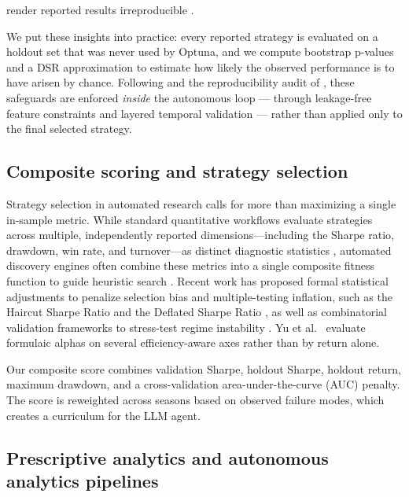 \documentclass[analytics,article,submit,pdftex,moreauthors]{Definitions/mdpi}
\begin{document}
render reported results irreproducible \citep{yao_zheng_2026}.

We put these insights into practice: every reported strategy is evaluated on a holdout set that was never used by Optuna, and we compute bootstrap p-values and a DSR approximation to estimate how likely the observed performance is to have arisen by chance. Following \citep{benjamini_hochberg_1995} and the reproducibility audit of \citep{yao_zheng_2026}, these safeguards are enforced \emph{inside} the autonomous loop --- through leakage-free feature constraints and layered temporal validation --- rather than applied only to the final selected strategy.

\subsection{Composite scoring and strategy selection}\label{composite-scoring-and-strategy-selection}

Strategy selection in automated research calls for more than maximizing a single in-sample metric. While standard quantitative workflows evaluate strategies across multiple, independently reported dimensions---including the Sharpe ratio, drawdown, win rate, and turnover---as distinct diagnostic statistics \citep{prado_2018}, automated discovery engines often combine these metrics into a single composite fitness function to guide heuristic search \citep{zhang_2025, allen_1999}. Recent work has proposed formal statistical adjustments to penalize selection bias and multiple-testing inflation, such as the Haircut Sharpe Ratio \citep{harvey_2015} and the Deflated Sharpe Ratio \citep{bailey_2014}, as well as combinatorial validation frameworks to stress-test regime instability \citep{prado_2018, bengio_2009}. Yu et al.~\citep{yu_2023_synergistic_alpha} evaluate formulaic alphas on several efficiency-aware axes rather than by return alone.

Our composite score combines validation Sharpe, holdout Sharpe, holdout return, maximum drawdown, and a cross-validation area-under-the-curve (AUC) penalty. The score is reweighted across seasons based on observed failure modes, which creates a curriculum for the LLM agent.

\subsection{Prescriptive analytics and autonomous analytics pipelines}\label{prescriptive-analytics-and-autonomous-analytics-pipelines}
\end{document}
